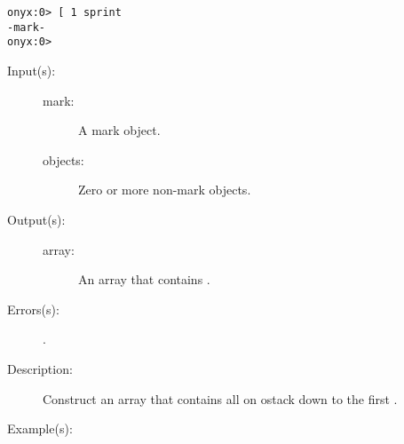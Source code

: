 \begin{description}
\begin{description}
\begin{verbatim}
onyx:0> [ 1 sprint
-mark-
onyx:0>
		\end{verbatim}
	\end{description}
\label{systemdict:sym_rb}
\index{]@\onyxop{}{{\rb}}{}}
\item[{\onyxop{mark objects}{{\rb}}{array}}: ]
	\begin{description}\item[]
	\item[Input(s): ]
		\begin{description}\item[]
		\item[mark: ]
			A mark object.
		\item[objects: ]
			Zero or more non-mark objects.
		\end{description}
	\item[Output(s): ]
		\begin{description}\item[]
		\item[array: ]
			An array that contains .
		\end{description}
	\item[Errors(s): ]
		\begin{description}\item[]
		\item[.]
		\end{description}
	\item[Description: ]
		Construct an array that contains all  on ostack
		down to the first .
	\item[Example(s): ]\begin{verbatim}


\end{verbatim}
\end{description}
\end{description}
